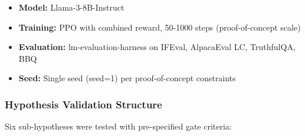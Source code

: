 
\begin{itemize}
\item \textbf{Model:} Llama-3-8B-Instruct
\item \textbf{Training:} PPO with combined reward, 50-1000 steps (proof-of-concept scale)
\item \textbf{Evaluation:} lm-evaluation-harness on IFEval, AlpacaEval LC, TruthfulQA, BBQ
\item \textbf{Seed:} Single seed (seed=1) per proof-of-concept constraints
\end{itemize}

\subsubsection{Hypothesis Validation Structure}

Six sub-hypotheses were tested with pre-specified gate criteria:

\begin{table}[htbp]
\centering
{}
\end{table}
